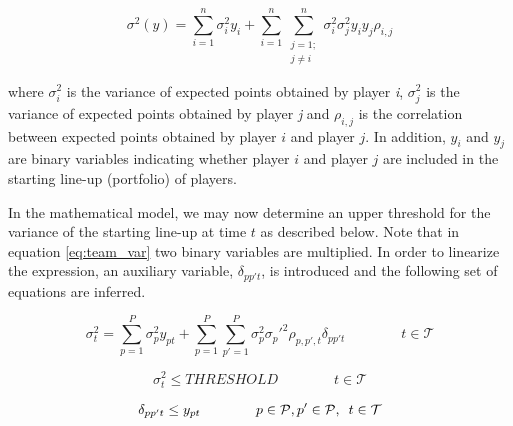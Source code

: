 \begin{equation}
    \sigma^2(y) = \sum_{i = 1}^{n}\sigma_i^2y_i + \sum_{i = 1}^{n}\sum_{\substack{j = 1;\\ j \neq i}}^{n} \sigma_i^{2}\sigma_j^{2}y_{i}y_{j}\rho_{i,j}
    \label{eq:team_var}
\end{equation}

where $\sigma_{i}^2$ is the variance of expected points obtained by player \textit{i}, $\sigma_{j}^2$ is the variance of expected points obtained by player \textit{j} and $\rho_{i,j}$ is the correlation between expected points obtained by player $i$ and player $j$. In addition, $y_i$ and $y_j$ are binary variables indicating whether player $i$ and player $j$ are included in the starting line-up
(portfolio) of players.\newline

In the mathematical model, we may now determine an upper threshold for the variance of the starting line-up at time $t$ as described below. Note that in equation \ref{eq:team_var} two binary variables are multiplied. In order to linearize the expression, an auxiliary variable, $\delta_{pp't}$, is introduced and the following set of equations are inferred.

\begin{equation}
    \sigma^2_{t} = \sum_{p = 1}^{P}\sigma_p^2 y_{pt} + \sum_{p = 1}^{P}\sum_{p' = 1}^{P} \sigma_p^2\sigma_p'^2\rho_{p,p',t} \delta_{pp't} \qquad\qquad t \in \mathcal{T}
\end{equation}

\begin{equation}
    \sigma^2_{t} \leq THRESHOLD \qquad\qquad t \in \mathcal{T}
\end{equation}

\begin{equation}
    \delta_{pp't} \leq y_{pt}  \qquad\qquad p \in \mathcal{P}, p' \in \mathcal{P}, \enskip t \in \mathcal{T}
\end{equation}

